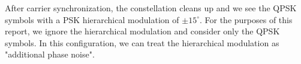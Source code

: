\documentclass[conference,onecolumn]{IEEEtran}
\begin{document}
\noindent After carrier synchronization, the constellation cleans up and we see the QPSK symbols with a PSK hierarchical modulation of $\pm15^{\circ}$. For the purposes of this report, we ignore the hierarchical modulation and consider only the QPSK symbols. In this configuration, we can treat the hierarchical modulation as "additional phase noise".




\end{document}
